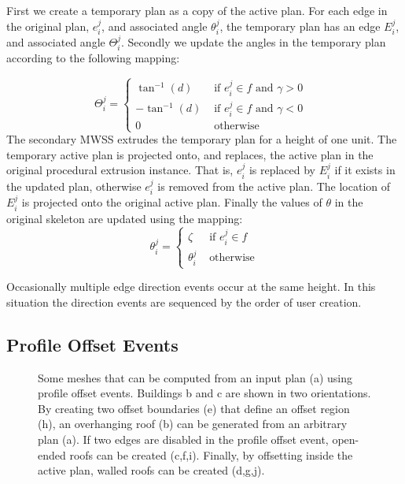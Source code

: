 First we create a temporary plan as a copy of the active plan. For each edge in the original plan, $e^j_i$, and associated angle $\theta_i^j$, the temporary plan has an edge $E^j_i$, and associated angle $\Theta_i^j$. Secondly we update the angles in the temporary plan according to the following mapping:

$$
\Theta_i^j = \left\{ \begin{array}{rl}
 \tan^{-1}(d) &\mbox{ if $e_i^j \in f$  and $\gamma > 0$ } \\
 -\tan^{-1}(d) &\mbox{ if $e_i^j \in f$ and $\gamma < 0$ } \\
 0 &\mbox{ otherwise}
       \end{array} \right.
$$
The secondary MWSS extrudes the temporary plan for a height of one unit. The temporary active plan is projected onto, and replaces, the active plan in the original procedural extrusion instance. That is, $e^j_i$ is replaced by $E^j_i$ if it exists in the updated plan, otherwise $e^j_i$ is removed from the active plan. The location of $E^j_i$ is projected onto the original active plan. Finally the values of $\theta$ in the original skeleton are updated using the mapping:
$$
\theta_i^j = \left\{ \begin{array}{rl}
 \zeta &\mbox{ if $e_i^j \in f$} \\
  \theta_i^j &\mbox{ otherwise}
       \end{array} \right.
$$


Occasionally multiple edge direction events occur at the same height. In this situation the direction events are sequenced by the order of user creation.

\FloatBarrier
\subsection {Profile Offset Events}
\label{section:profileOffsetEvents}

\begin{figure}
  \centering
  \def\svgwidth{0.7\columnwidth}
  
  \caption[Profile Offset events]{\label{fig:offset_triple} Some meshes that can be computed from an input plan (a) using profile offset events. Buildings b and c are shown in two orientations. By creating two offset boundaries (e) that define an offset region (h), an overhanging roof (b) can be generated from an arbitrary plan (a). If two edges are disabled in the profile offset event, open-ended roofs can be created (c,f,i). Finally, by offsetting inside the active plan, walled roofs can be created (d,g,j). }

\end{figure}


